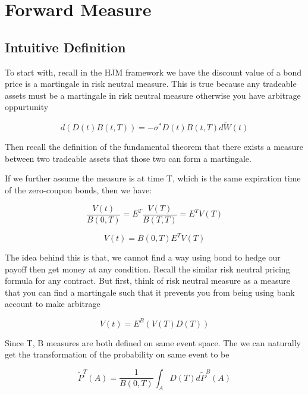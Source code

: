 \section{Forward Measure}

\subsection{Intuitive Definition}

To start with, recall in the HJM framework we have the discount value of a bond price is a martingale in risk neutral measure. This is true
because any tradeable assets must be a martingale in risk neutral measure otherwise you have arbitrage oppurtunity

\begin{equation}
  d(D(t)B(t, T)) = -\sigma^{\ast}D(t)B(t, T)d\widetilde{W}(t)
\end{equation}

Then recall the definition of the fundamental theorem that there exists a measure between two tradeable assets that those two can form a martingale.

If we further assume the measure is at time T, which is the same expiration time of the zero-coupon bonds, then we have:

\begin{equation}
  \frac{V(t)}{B(0, T)} = E^{T}\frac{V(T)}{B(T, T)} = E^{T}V(T)
\end{equation}

\begin{equation}
  V(t) = B(0, T)E^{T}V(T)
\end{equation}

The idea behind this is that, we cannot find a way using bond to hedge our payoff then get money at any condition. Recall the similar risk neutral
pricing formula for any contract. But first, think of risk neutral measure as a measure that you can find a martingale such that it prevents you from being using
bank account to make arbitrage

\begin{equation}
  V(t) = E^{B}(V(T)D(T))
\end{equation}


Since T, B measures are both defined on same event space. The we can naturally get the transformation of the probability on same event to be

\begin{equation}
  \widetilde{P}^{T}(A) = \frac{1}{B(0, T)} \int_A D(T) d\widetilde{P}^B(A)
\end{equation}


